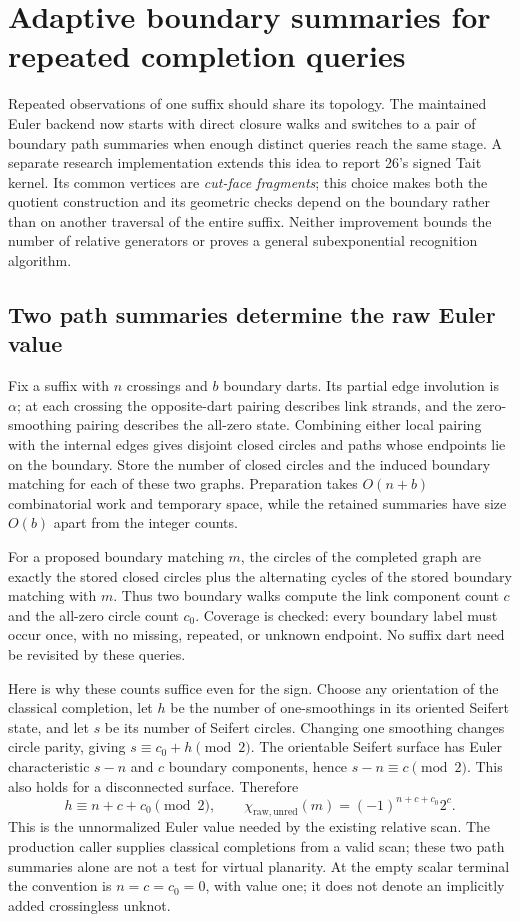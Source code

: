 \section{Adaptive boundary summaries for repeated completion queries}
\label{sec:boundary-reuse}

Repeated observations of one suffix should share its topology.  The maintained
Euler backend now starts with direct closure walks and switches to a pair of
boundary path summaries when enough distinct queries reach the same stage.
A separate research implementation extends this idea to report 26's signed
Tait kernel.  Its common vertices are \emph{cut-face fragments}; this choice
makes both the quotient construction and its geometric checks depend on the
boundary rather than on another traversal of the entire suffix.
Neither improvement bounds the number of relative generators or proves a
general subexponential recognition algorithm.

\subsection{Two path summaries determine the raw Euler value}

Fix a suffix with $n$ crossings and $b$ boundary darts.  Its partial edge
involution is $\alpha$; at each crossing the opposite-dart pairing describes
link strands, and the zero-smoothing pairing describes the all-zero state.
Combining either local pairing with the internal edges gives disjoint closed
circles and paths whose endpoints lie on the boundary.  Store the number of
closed circles and the induced boundary matching for each of these two graphs.
Preparation takes $O(n+b)$ combinatorial work and temporary space, while the
retained summaries have size $O(b)$ apart from the integer counts.

For a proposed boundary matching $m$, the circles of the completed graph
are exactly the stored closed circles plus the alternating cycles of the
stored boundary matching with $m$.  Thus two boundary walks compute the link
component count $c$ and the all-zero circle count $c_0$.  Coverage is checked:
every boundary label must occur once, with no missing, repeated, or unknown
endpoint.  No suffix dart need be revisited by these queries.

Here is why these counts suffice even for the sign.  Choose any orientation
of the classical completion, let $h$ be the number of one-smoothings in its
oriented Seifert state, and let $s$ be its number of Seifert circles.  Changing
one smoothing changes circle parity, giving $s\equiv c_0+h\pmod2$.
The orientable Seifert surface has Euler characteristic $s-n$ and $c$
boundary components, hence $s-n\equiv c\pmod2$.  This also holds for a
disconnected surface.  Therefore
\[
 h\equiv n+c+c_0\pmod2,\qquad
 \chi_{\mathrm{raw,unred}}(m)=(-1)^{n+c+c_0}2^c.
\]
This is the unnormalized Euler value needed by the existing relative scan.
The production caller supplies classical completions from a valid scan;
these two path summaries alone are not a test for virtual planarity.
At the empty scalar terminal the convention is $n=c=c_0=0$, with value one;
it does not denote an implicitly added crossingless unknot.


